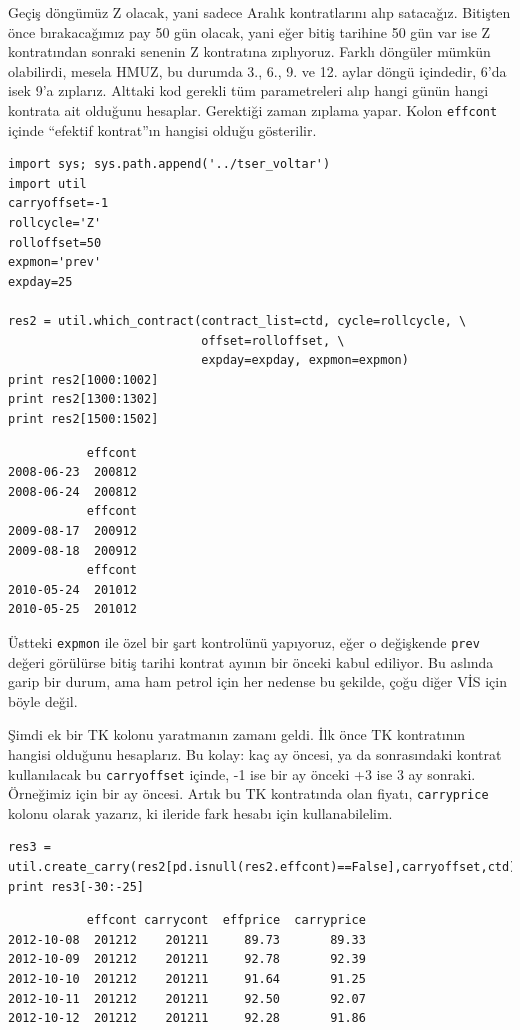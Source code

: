 \documentclass[12pt,fleqn]{article}\usepackage{../../common}
\begin{document}
Geçiş döngümüz Z olacak, yani sadece Aralık kontratlarını alıp satacağız.
Bitişten önce bırakacağımız pay 50 gün olacak, yani eğer bitiş tarihine 50 gün
var ise Z kontratından sonraki senenin Z kontratına zıplıyoruz. Farklı döngüler
mümkün olabilirdi, mesela HMUZ, bu durumda 3., 6., 9. ve 12. aylar döngü
içindedir, 6'da isek 9'a zıplarız. Alttaki kod gerekli tüm parametreleri alıp
hangi günün hangi kontrata ait olduğunu hesaplar. Gerektiği zaman zıplama
yapar. Kolon \verb!effcont! içinde ``efektif kontrat''ın hangisi olduğu
gösterilir. 

\begin{verbatim}
import sys; sys.path.append('../tser_voltar')
import util
carryoffset=-1
rollcycle='Z'
rolloffset=50
expmon='prev'
expday=25

res2 = util.which_contract(contract_list=ctd, cycle=rollcycle, \
                           offset=rolloffset, \
                           expday=expday, expmon=expmon)
print res2[1000:1002]
print res2[1300:1302]
print res2[1500:1502]
\end{verbatim}

\begin{verbatim}
           effcont
2008-06-23  200812
2008-06-24  200812
           effcont
2009-08-17  200912
2009-08-18  200912
           effcont
2010-05-24  201012
2010-05-25  201012
\end{verbatim}

Üstteki \verb!expmon! ile özel bir şart kontrolünü yapıyoruz, eğer o değişkende
\verb!prev! değeri görülürse bitiş tarihi kontrat ayının bir önceki kabul
ediliyor. Bu aslında garip bir durum, ama ham petrol için her nedense bu
şekilde, çoğu diğer VİS için böyle değil.

Şimdi ek bir TK kolonu yaratmanın zamanı geldi. İlk önce TK kontratının hangisi
olduğunu hesaplarız. Bu kolay: kaç ay öncesi, ya da sonrasındaki kontrat
kullanılacak bu \verb!carryoffset! içinde, -1 ise bir ay önceki +3 ise 3 ay
sonraki. Örneğimiz için bir ay öncesi. Artık bu TK kontratında olan fiyatı,
\verb!carryprice! kolonu olarak yazarız, ki ileride fark hesabı için
kullanabilelim.

\begin{verbatim}
res3 = util.create_carry(res2[pd.isnull(res2.effcont)==False],carryoffset,ctd)
print res3[-30:-25]
\end{verbatim}

\begin{verbatim}
           effcont carrycont  effprice  carryprice
2012-10-08  201212    201211     89.73       89.33
2012-10-09  201212    201211     92.78       92.39
2012-10-10  201212    201211     91.64       91.25
2012-10-11  201212    201211     92.50       92.07
2012-10-12  201212    201211     92.28       91.86
\end{verbatim}
\end{document}
